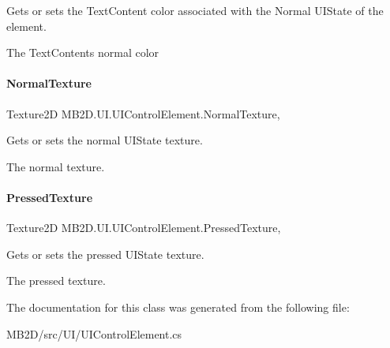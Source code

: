 Gets or sets the Text\+Content color associated with the Normal U\+I\+State of the element. 

The Text\+Contents normal color\hypertarget{class_m_b2_d_1_1_u_i_1_1_u_i_control_element_aa0a258c82660be7625aa011fe038095c}{}\label{class_m_b2_d_1_1_u_i_1_1_u_i_control_element_aa0a258c82660be7625aa011fe038095c} 
\paragraph{\texorpdfstring{Normal\+Texture}{NormalTexture}}
{\footnotesize\ttfamily Texture2D M\+B2\+D.\+U\+I.\+U\+I\+Control\+Element.\+Normal\+Texture\hspace{0.3cm}{\ttfamily [get]}, {\ttfamily [set]}}



Gets or sets the normal U\+I\+State texture. 

The normal texture.\hypertarget{class_m_b2_d_1_1_u_i_1_1_u_i_control_element_a67a317960e2c07d7871568eba8073025}{}\label{class_m_b2_d_1_1_u_i_1_1_u_i_control_element_a67a317960e2c07d7871568eba8073025} 
\paragraph{\texorpdfstring{Pressed\+Texture}{PressedTexture}}
{\footnotesize\ttfamily Texture2D M\+B2\+D.\+U\+I.\+U\+I\+Control\+Element.\+Pressed\+Texture\hspace{0.3cm}{\ttfamily [get]}, {\ttfamily [set]}}



Gets or sets the pressed U\+I\+State texture. 

The pressed texture.

The documentation for this class was generated from the following file\+:\begin{DoxyCompactItemize}
\item 
M\+B2\+D/src/\+U\+I/U\+I\+Control\+Element.\+cs\end{DoxyCompactItemize}
